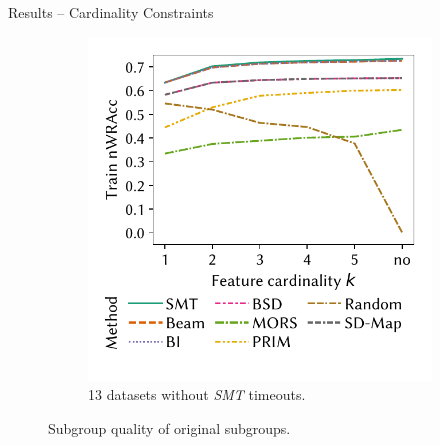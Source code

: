 \documentclass[en, navbaroff]{sdqbeamer}
\begin{document}
\begin{frame}[t]{Results -- Cardinality Constraints}
\begin{figure}
\begin{subfigure}[t]{0.35\textwidth}
			\centering
			\includegraphics[width=\textwidth, trim=10 25 10 10, clip]{plots/csd-cardinality-train-nwracc-no-timeout-datasets.pdf}
			\caption{13 datasets without \emph{SMT} timeouts.}
			\label{fig:csd:cardinality-train-nwracc-no-timeout-datasets}
		\end{subfigure}
		\caption*{
			Subgroup quality of original subgroups.
		}
		\label{fig:csd:cardinality:main}
	\end{figure}
\end{frame}
\end{document}
